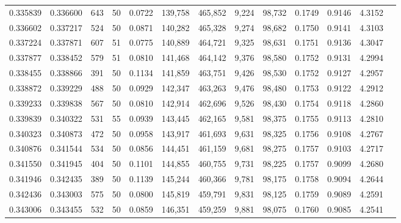 \begin{tabular}{rrrrrrrrrrrrr}
0.335839 & 0.336600 &   643 &  50 &                                     0.0722 & 139,758 & 465,852 &   9,224 &  98,732 & 0.1749 & 0.9146 & 4.3152 \\
0.336602 & 0.337217 &   524 &  50 &                                     0.0871 & 140,282 & 465,328 &   9,274 &  98,682 & 0.1750 & 0.9141 & 4.3103 \\
0.337224 & 0.337871 &   607 &  51 &                                     0.0775 & 140,889 & 464,721 &   9,325 &  98,631 & 0.1751 & 0.9136 & 4.3047 \\
0.337877 & 0.338452 &   579 &  51 &                                     0.0810 & 141,468 & 464,142 &   9,376 &  98,580 & 0.1752 & 0.9131 & 4.2994 \\
0.338455 & 0.338866 &   391 &  50 &                                     0.1134 & 141,859 & 463,751 &   9,426 &  98,530 & 0.1752 & 0.9127 & 4.2957 \\
0.338872 & 0.339229 &   488 &  50 &                                     0.0929 & 142,347 & 463,263 &   9,476 &  98,480 & 0.1753 & 0.9122 & 4.2912 \\
0.339233 & 0.339838 &   567 &  50 &                                     0.0810 & 142,914 & 462,696 &   9,526 &  98,430 & 0.1754 & 0.9118 & 4.2860 \\
0.339839 & 0.340322 &   531 &  55 &                                     0.0939 & 143,445 & 462,165 &   9,581 &  98,375 & 0.1755 & 0.9113 & 4.2810 \\
0.340323 & 0.340873 &   472 &  50 &                                     0.0958 & 143,917 & 461,693 &   9,631 &  98,325 & 0.1756 & 0.9108 & 4.2767 \\
0.340876 & 0.341544 &   534 &  50 &                                     0.0856 & 144,451 & 461,159 &   9,681 &  98,275 & 0.1757 & 0.9103 & 4.2717 \\
0.341550 & 0.341945 &   404 &  50 &                                     0.1101 & 144,855 & 460,755 &   9,731 &  98,225 & 0.1757 & 0.9099 & 4.2680 \\
0.341946 & 0.342435 &   389 &  50 &                                     0.1139 & 145,244 & 460,366 &   9,781 &  98,175 & 0.1758 & 0.9094 & 4.2644 \\
0.342436 & 0.343003 &   575 &  50 &                                     0.0800 & 145,819 & 459,791 &   9,831 &  98,125 & 0.1759 & 0.9089 & 4.2591 \\
0.343006 & 0.343455 &   532 &  50 &                                     0.0859 & 146,351 & 459,259 &   9,881 &  98,075 & 0.1760 & 0.9085 & 4.2541 \\

\end{tabular}

